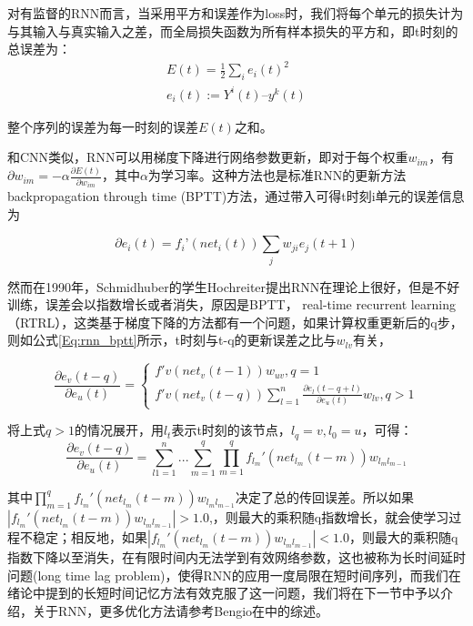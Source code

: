 对有监督的RNN而言，当采用平方和误差作为loss时，我们将每个单元的损失计为与其输入与真实输入之差，而全局损失函数为所有样本损失的平方和，即t时刻的总误差为：
\begin{equation}
 \begin{array}{lr}
E(t) = \frac{1}{2}\sum_i{{e_i(t)}^2}\\
e_i(t) := Y^i(t) –y^k(t)
 \end{array}
\end{equation}

整个序列的误差为每一时刻的误差$E(t)$之和。


和CNN类似，RNN可以用梯度下降进行网络参数更新，即对于每个权重$w_{im}$，有
$\partial w_{im} = -\alpha \frac{\partial E(t)}{\partial w_{im}}$，其中$\alpha$为学习率。这种方法也是标准RNN的更新方法backpropagation through time (BPTT)方法，通过带入可得t时刻i单元的误差信息为

\begin{equation}
\partial e_i(t) = f_i’(net_i(t))\sum_j{w_{ji}e_j(t+1)}
\end{equation}

然而在1990年，Schmidhuber的学生Hochreiter提出RNN在理论上很好，但是不好训练，误差会以指数增长或者消失\cite{williams1995gradient}，原因是BPTT， real-time recurrent learning（RTRL）\cite{williams1989learning}，这类基于梯度下降的方法都有一个问题，如果计算权重更新后的q步，则如公式\ref{Eq:rnn_bptt}所示，t时刻与t-q的更新误差之比与$w_{lv}$有关，

\begin{equation}\label{Eq:rnn_bptt}
	\frac{\partial e_v(t-q)}{\partial e_u(t)} = 
	\left\{
	\begin{array}{lr}
		f'v(net_v(t-1))w_{uv}, q=1\\
		f'v(net_v(t-q))\sum_{l=1}^n{\frac{\partial e_l(t-q+l)}{\partial e_u(t)}w_{lv}}, q>1
	\end{array}
	\right.
\end{equation}

将上式$q>1$的情况展开，用$l_t$表示t时刻的该节点，$l_q = v, l_0 = u$，可得：
\begin{equation}
 \frac{\partial e_v(t-q)}{\partial e_u(t)} = \sum_{l1=1}^n ... \sum_{m=1}^q{\prod_{m=1}^q{f_{l_m}'(net_{l_m}(t-m))w_{l_ml_{m-1}}}}
\end{equation}

其中$\prod_{m=1}^q{f_{l_m}'(net_{l_m}(t-m))w_{l_ml_{m-1}}}$决定了总的传回误差。所以如果$|{f_{l_m}'(net_{l_m}(t-m))w_{l_ml_{m-1}}}|>1.0$,，则最大的乘积随q指数增长，就会使学习过程不稳定；相反地，如果$|{f_{l_m}'(net_{l_m}(t-m))w_{l_ml_{m-1}}}|<1.0$，则最大的乘积随q指数下降以至消失，在有限时间内无法学到有效网络参数，这也被称为长时间延时问题(long time lag problem)，使得RNN的应用一度局限在短时间序列，而我们在绪论中提到的长短时间记忆方法有效克服了这一问题，我们将在下一节中予以介绍，关于RNN，更多优化方法请参考Bengio在\cite{bengio2013advances}中的综述。






